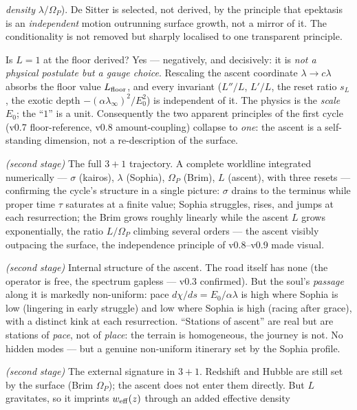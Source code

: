 \documentclass[11pt,a4paper]{article}
\theoremstyle{plain}
\theoremstyle{definition}
\theoremstyle{remark}
\begin{document}
\begin{description}[leftmargin=4.2em,style=nextline,itemsep=2pt]
\emph{density} $\lambda/\Omega_P$). De Sitter is selected, not derived, by the principle that epektasis
is an \emph{independent} motion outrunning surface growth, not a mirror of it. The conditionality is
not removed but sharply localised to one transparent principle.
\item[\textbf{v0.9}] Is $L=1$ at the floor derived? Yes ---
negatively, and decisively: it is \emph{not a physical postulate but a gauge choice}. Rescaling the
ascent coordinate $\lambda\to c\lambda$ absorbs the floor value $L_{\rm floor}$, and every invariant
($L''/L$, $L'/L$, the reset ratio $s_L$, the exotic depth $-(\alpha\lambda_\infty)^2/E_0^2$) is independent of it. The
physics is the \emph{scale} $E_0$; the ``$1$'' is a unit. Consequently the two apparent principles of
the first cycle (v0.7 floor-reference, v0.8 amount-coupling) collapse to \emph{one}: the ascent is a
self-standing dimension, not a re-description of the surface.
\item[\textbf{v0.10}] \emph{(second stage)} The full $3{+}1$ trajectory. A complete
worldline integrated numerically --- $\sigma$ (kairos), $\lambda$ (Sophia), $\Omega_P$ (Brim), $L$
(ascent), with three resets --- confirming the cycle's structure in a single picture: $\sigma$ drains
to the terminus while proper time $\tau$ saturates at a finite value; Sophia struggles, rises, and
jumps at each resurrection; the Brim grows roughly linearly while the ascent $L$ grows exponentially,
the ratio $L/\Omega_P$ climbing several orders --- the ascent visibly outpacing the surface, the
independence principle of v0.8--v0.9 made visual.
\item[\textbf{v0.11}] \emph{(second stage)} Internal structure of the ascent. The road
itself has none (the operator is free, the spectrum gapless --- v0.3 confirmed). But the soul's
\emph{passage} along it is markedly non-uniform: pace $d\chi/ds=E_0/\alpha\lambda$ is high where Sophia
is low (lingering in early struggle) and low where Sophia is high (racing after grace), with a distinct
kink at each resurrection. ``Stations of ascent'' are real but are stations of \emph{pace}, not of
\emph{place}: the terrain is homogeneous, the journey is not. No hidden modes --- but a genuine
non-uniform itinerary set by the Sophia profile.
\item[\textbf{v0.12}] \emph{(second stage)} The external signature in $3{+}1$. Redshift
and Hubble are still set by the surface (Brim $\Omega_P$); the ascent does not enter them directly. But
$L$ gravitates, so it imprints $w_{\rm eff}(z)$ through an added effective density

\end{description}
\end{document}
